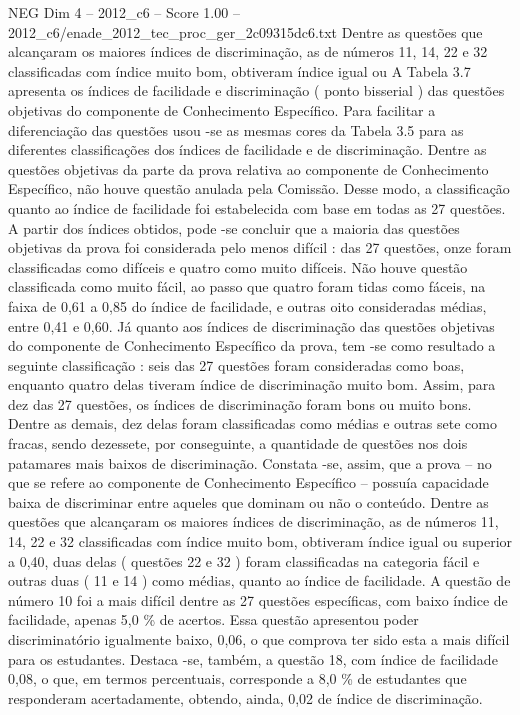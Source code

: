 \begin{textsample}{NEG Dim 4 – 2012\_c6 – Score 1.00 – 2012\_c6/enade\_2012\_tec\_proc\_ger\_2c09315dc6.txt}
Dentre as questões que alcançaram os maiores índices de discriminação, as de números 11, 14, 22 e 32 classificadas com índice muito bom, obtiveram índice igual ou A Tabela 3.7 apresenta os índices de facilidade e discriminação ( ponto bisserial ) das questões objetivas do componente de Conhecimento Específico.
Para facilitar a diferenciação das questões usou -se as mesmas cores da Tabela 3.5 para as diferentes classificações dos índices de facilidade e de discriminação.
Dentre as questões objetivas da parte da prova relativa ao componente de Conhecimento Específico, não houve questão anulada pela Comissão.
Desse modo, a classificação quanto ao índice de facilidade foi estabelecida com base em todas as 27 questões.
A partir dos índices obtidos, pode -se concluir que a maioria das questões objetivas da prova foi considerada pelo menos difícil : das 27 questões, onze foram classificadas como difíceis e quatro como muito difíceis.
Não houve questão classificada como muito fácil, ao passo que quatro foram tidas como fáceis, na faixa de 0,61 a 0,85 do índice de facilidade, e outras oito consideradas médias, entre 0,41 e 0,60.
Já quanto aos índices de discriminação das questões objetivas do componente de Conhecimento Específico da prova, tem -se como resultado a seguinte classificação : seis das 27 questões foram consideradas como boas, enquanto quatro delas tiveram índice de discriminação muito bom.
Assim, para dez das 27 questões, os índices de discriminação foram bons ou muito bons.
Dentre as demais, dez delas foram classificadas como médias e outras sete como fracas, sendo dezessete, por conseguinte, a quantidade de questões nos dois patamares mais baixos de discriminação.
Constata -se, assim, que a prova – no que se refere ao componente de Conhecimento Específico – possuía capacidade baixa de discriminar entre aqueles que dominam ou não o conteúdo.
Dentre as questões que alcançaram os maiores índices de discriminação, as de números 11, 14, 22 e 32 classificadas com índice muito bom, obtiveram índice igual ou superior a 0,40, duas delas ( questões 22 e 32 ) foram classificadas na categoria fácil e outras duas ( 11 e 14 ) como médias, quanto ao índice de facilidade.
A questão de número 10 foi a mais difícil dentre as 27 questões específicas, com baixo índice de facilidade, apenas 5,0 \% de acertos.
Essa questão apresentou poder discriminatório igualmente baixo, 0,06, o que comprova ter sido esta a mais difícil para os estudantes.
Destaca -se, também, a questão 18, com índice de facilidade 0,08, o que, em termos percentuais, corresponde a 8,0 \% de estudantes que responderam acertadamente, obtendo, ainda, 0,02 de índice de discriminação.

\end{textsample}
